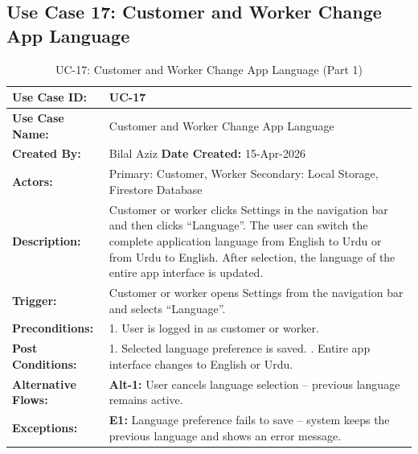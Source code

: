 \newpage

\subsection*{Use Case 17: Customer and Worker Change App Language}

{\small
\renewcommand{\arraystretch}{1.05}
\begin{table}[H]
\centering
\begin{tabular}{|p{3cm}|p{11.2cm}|}
\hline
\textbf{Use Case ID:} & UC-17 \\ \hline
\textbf{Use Case Name:} & Customer and Worker Change App Language \\ \hline
\textbf{Created By:} & Bilal Aziz \hfill \textbf{Date Created:} 15-Apr-2026 \\ \hline
\textbf{Actors:} & Primary: Customer, Worker \quad Secondary: Local Storage, Firestore Database \\ \hline
\textbf{Description:} & Customer or worker clicks Settings in the navigation bar and then clicks ``Language''. The user can switch the complete application language from English to Urdu or from Urdu to English. After selection, the language of the entire app interface is updated. \\ \hline
\textbf{Trigger:} & Customer or worker opens Settings from the navigation bar and selects ``Language''. \\ \hline
\textbf{Preconditions:} & 1. User is logged in as customer or worker. \\ \hline
\textbf{Post Conditions:} & 1. Selected language preference is saved. \newline 2. Entire app interface changes to English or Urdu. \\ \hline
\textbf{Alternative Flows:} & \textbf{Alt-1:} User cancels language selection -- previous language remains active. \\ \hline
\textbf{Exceptions:} & \textbf{E1:} Language preference fails to save -- system keeps the previous language and shows an error message. \\ \hline
\end{tabular}
\caption*{UC-17: Customer and Worker Change App Language (Part 1)}
\end{table}
}

\newpage

